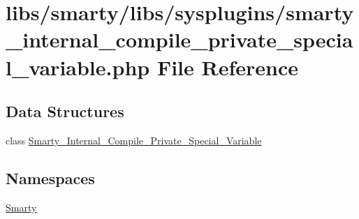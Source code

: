 \hypertarget{smarty__internal__compile__private__special__variable_8php}{}\section{libs/smarty/libs/sysplugins/smarty\+\_\+internal\+\_\+compile\+\_\+private\+\_\+special\+\_\+variable.php File Reference}
\label{smarty__internal__compile__private__special__variable_8php}
\subsection*{Data Structures}
\begin{DoxyCompactItemize}
\item 
class \hyperlink{class_smarty___internal___compile___private___special___variable}{Smarty\+\_\+\+Internal\+\_\+\+Compile\+\_\+\+Private\+\_\+\+Special\+\_\+\+Variable}
\end{DoxyCompactItemize}
\subsection*{Namespaces}
\begin{DoxyCompactItemize}
\item 
 \hyperlink{namespace_smarty}{Smarty}
\end{DoxyCompactItemize}
